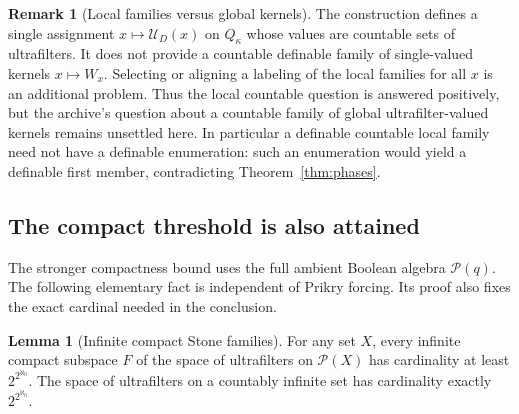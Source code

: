 \documentclass[11pt,letterpaper]{article}
\theoremstyle{definition}
\newtheorem{lemma}[definition]{Lemma}
\newtheorem{remark}[definition]{Remark}
\numberwithin{equation}{section}
\newcommand{\powerset}{\mathcal P}
\begin{document}
\begin{remark}[Local families versus global kernels]\label{rem:countable}
The construction defines a single assignment
$x\mapsto\mathcal U_D(x)$ on $Q_\kappa$ whose values are countable sets
of ultrafilters. It does not provide a countable definable family of
single-valued kernels $x\mapsto W_x$. Selecting or aligning a labeling of
the local families for all $x$ is an additional problem. Thus the local
countable question is answered positively, but the archive's question
about a countable family of global ultrafilter-valued kernels remains
unsettled here. In particular a definable countable local family need not
have a definable enumeration: such an enumeration would yield a definable
first member, contradicting Theorem~\ref{thm:phases}.
\end{remark}

\subsection{The compact threshold is also attained}

The stronger compactness bound uses the full ambient Boolean algebra
$\powerset(q)$. The following elementary fact is independent of Prikry
forcing. Its proof also fixes the exact cardinal needed in the conclusion.

\begin{lemma}[Infinite compact Stone families]\label{lem:stonecard}
For any set $X$, every infinite compact subspace $F$ of the space of
ultrafilters on $\powerset(X)$ has cardinality at least
$2^{2^{\aleph_0}}$. The space of ultrafilters on a countably infinite set
has cardinality exactly $2^{2^{\aleph_0}}$.
\end{lemma}
\end{document}
